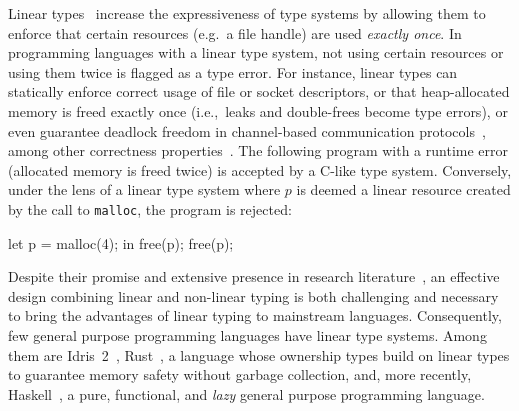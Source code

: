 \documentclass[acmsmall,review,anonymous,screen]{acmart}
\begin{document}
Linear types~\cite{cite:linear-logic,cite:barberdill} increase the expressiveness
of type systems by allowing them to enforce that certain resources (e.g.~a
file handle) are used \emph{exactly once}.
%
In programming languages with a linear type system, not using certain resources
or using them twice is flagged as a type error. For instance, linear types can
statically enforce correct usage of file or socket descriptors, or
that heap-allocated memory is freed exactly once (i.e.,~leaks and double-frees become
type errors), or even guarantee deadlock freedom in channel-based communication
protocols~\cite{10.1007/978-3-642-15375-4_16},
among other correctness properties~\cite{10.1145/3373718.3394765,10.1145/3527313,cite:linearhaskell}.
%
The following program with a runtime error (allocated memory is freed twice) is
accepted by a C-like type system. Conversely, under the lens of a linear type
system where $p$ is deemed a linear resource created by the call to
\texttt{malloc}, the program is rejected:
\begin{code}
let p = malloc(4); in free(p); free(p);
\end{code}

Despite their promise and extensive presence in research
literature~\cite{Wadler1990LinearTC,CERVESATO2000133,10.1093/logcom/2.3.297},
an effective design combining linear and non-linear typing is both
challenging and necessary to bring the advantages of linear typing to
mainstream languages.
%
Consequently, few general purpose programming languages have linear
type systems. Among them are Idris~2~\cite{brady:LIPIcs.ECOOP.2021.9},
Rust~\cite{10.1145/2692956.2663188}, a language whose
ownership types build on linear types to guarantee memory safety
without garbage collection, and, more recently,
Haskell~\cite{cite:linearhaskell}, a pure, functional, and
\emph{lazy} general purpose programming language.
%
%
\end{document}

